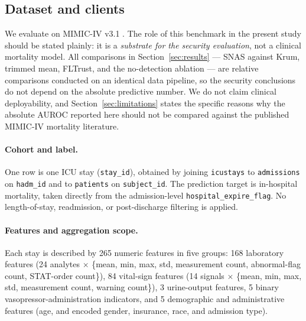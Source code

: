 \documentclass[pdflatex,sn-mathphys-num]{sn-jnl}
\begin{document}
\subsection{Dataset and clients}

We evaluate on MIMIC-IV v3.1 \cite{johnson2023mimic}. The role of this benchmark in the present study should be stated plainly: it is a \emph{substrate for the security evaluation}, not a clinical mortality model. All comparisons in Section~\ref{sec:results} --- SNAS against Krum, trimmed mean, FLTrust, and the no-detection ablation --- are relative comparisons conducted on an identical data pipeline, so the security conclusions do not depend on the absolute predictive number. We do not claim clinical deployability, and Section~\ref{sec:limitations} states the specific reasons why the absolute AUROC reported here should not be compared against the published MIMIC-IV mortality literature.

\paragraph{Cohort and label.} One row is one ICU stay (\texttt{stay\_id}), obtained by joining \texttt{icustays} to \texttt{admissions} on \texttt{hadm\_id} and to \texttt{patients} on \texttt{subject\_id}. The prediction target is in-hospital mortality, taken directly from the admission-level \texttt{hospital\_expire\_flag}. No length-of-stay, readmission, or post-discharge filtering is applied.

\paragraph{Features and aggregation scope.} Each stay is described by 265 numeric features in five groups: 168 laboratory features (24 analytes $\times$ \{mean, min, max, std, measurement count, abnormal-flag count, STAT-order count\}), 84 vital-sign features (14 signals $\times$ \{mean, min, max, std, measurement count, warning count\}), 3 urine-output features, 5 binary vasopressor-administration indicators, and 5 demographic and administrative features (age, and encoded gender, insurance, race, and admission type).
\end{document}
